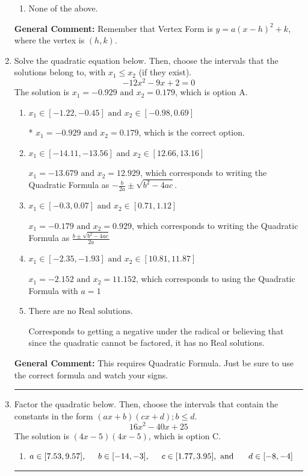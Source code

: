\documentclass{extbook}[14pt]
\newcommand{\litem}[1]{\item #1

\rule{\textwidth}{0.4pt}}
\begin{document}
\begin{enumerate}
{\begin{enumerate}[label=\Alph*.]
\begin{multicols}{2}
\end{multicols}\item None of the above.\end{enumerate}
\textbf{General Comment:} Remember that Vertex Form is $y = a(x-h)^2+k$, where the vertex is $(h, k)$.
}
\litem{
Solve the quadratic equation below. Then, choose the intervals that the solutions belong to, with $x_1 \leq x_2$ (if they exist).
\[ -12x^{2} -9 x + 2 = 0 \]The solution is \( x_1 = -0.929 \text{ and } x_2 = 0.179 \), which is option A.\begin{enumerate}[label=\Alph*.]
\item \( x_1 \in [-1.22, -0.45] \text{ and } x_2 \in [-0.98, 0.69] \)

* $x_1 = -0.929 \text{ and } x_2 = 0.179$, which is the correct option.
\item \( x_1 \in [-14.11, -13.56] \text{ and } x_2 \in [12.66, 13.16] \)

 $x_1 = -13.679 \text{ and } x_2 = 12.929$, which corresponds to writing the Quadratic Formula as $-\frac{b}{2a} \pm \sqrt{b^2 - 4ac}$.
\item \( x_1 \in [-0.3, 0.07] \text{ and } x_2 \in [0.71, 1.12] \)

 $x_1 = -0.179 \text{ and } x_2 = 0.929$, which corresponds to writing the Quadratic Formula as $\frac{b \pm \sqrt{b^2 - 4ac}}{2a}$
\item \( x_1 \in [-2.35, -1.93] \text{ and } x_2 \in [10.81, 11.87] \)

 $x_1 = -2.152 \text{ and } x_2 = 11.152$, which corresponds to using the Quadratic Formula with $a=1$
\item \( \text{There are no Real solutions.} \)

Corresponds to getting a negative under the radical or believing that since the quadratic cannot be factored, it has no Real solutions.
\end{enumerate}

\textbf{General Comment:} This requires Quadratic Formula. Just be sure to use the correct formula and watch your signs.
}
\litem{
Factor the quadratic below. Then, choose the intervals that contain the constants in the form $(ax+b)(cx+d); b \leq d.$
\[ 16x^{2} -40 x + 25 \]The solution is \( (4x -5)(4x -5) \), which is option C.\begin{enumerate}[label=\Alph*.]
\item \( a \in [7.53, 9.57], \hspace*{5mm} b \in [-14, -3], \hspace*{5mm} c \in [1.77, 3.95], \text{ and } \hspace*{5mm} d \in [-8, -4] \)


\end{enumerate}}
\end{enumerate}
\end{document}
